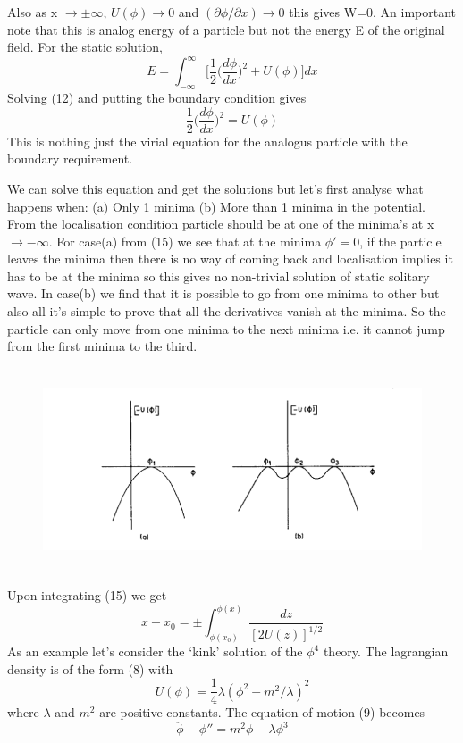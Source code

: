 \documentclass[a4paper, 12pt]{article}
\begin{document}
 Also as x $\to \pm \infty$, $U(\phi)\to 0$ and $ (\partial \phi / \partial x) \to 0 $ this gives W=0. An important note that this is analog energy of a particle but not the energy E of the original field. For the static solution,
 \begin{equation}%
 E = \int_{-\infty}^{\infty} \bigg[\frac{1}{2}\bigg(\frac{d\phi}{dx}\bigg)^2 + U(\phi) \bigg] dx
  \end{equation}
  Solving (12) and putting the boundary condition gives
  \begin{equation}%
  \frac{1}{2}\bigg(\frac{d\phi}{dx}\bigg)^2 = U(\phi)
  \end{equation}
 This is nothing just the virial equation for the analogus particle with the boundary requirement. 

 We can solve this equation and get the solutions but let's first analyse what happens when: (a) Only 1 minima (b) More than 1 minima in the potential. From the localisation condition particle should be at one of the minima's at x$\to -\infty$. For case(a) from (15) we see that at the minima $\phi'=0$, if the particle leaves the minima then there is no way of coming back and localisation implies it has to be at the minima so this gives no non-trivial solution of static solitary wave. In case(b) we find that it is possible to go from one minima to other but also all it's simple to prove that all the derivatives vanish at the minima. So the particle can only move from one minima to the next minima i.e. it cannot jump from the first minima to the third.
 
 \begin{figure}[ht]
    \centering
    \includegraphics[height=6cm, width=14cm]{fig1}
\end{figure}

 Upon integrating (15) we get
 \begin{equation}%
 x - x_0 = \pm \int_{\phi(x_0)}^{\phi(x)}\frac{dz}{[2U(z)]^{1/2}}
 \end{equation}
 As an example let's consider the `kink' solution of the $\phi^4$ theory. The lagrangian density is of the form (8) with
 \begin{equation}%
 U(\phi) = \frac{1}{4}\lambda(\phi^2 - m^2/\lambda)^2
 \end{equation}
 where $\lambda$ and $m^2$ are positive constants. The equation of motion (9) becomes
 \begin{equation}%
 \ddot{\phi} - \phi'' = m^2 \phi - \lambda \phi^3
 \end{equation}
 
\end{document}
